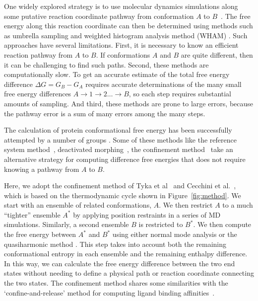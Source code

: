 \documentclass[12pt]{article}
\begin{document}
One widely explored strategy
is to use molecular dynamics simulations along some putative reaction coordinate pathway from conformation $A$ to
$B$~\cite{Elber2007,West2007,Haas2007,Jonsson1998,E2007,Dellago2002,Cheng2006,Elber2005,Chipot2007}. The free energy along this
reaction coordinate can then be determined using methods such as umbrella sampling \cite{Torrie1977,Mascarenhas2013}  
and weighted histogram analysis method (WHAM) \cite{Kumar1992}. Such
approaches have several limitations. First, it is necessary to know an efficient reaction pathway from $A$ to $B$. If
conformations $A$ and $B$ are quite different, then it can be challenging to find such paths. Second, these methods are
computationally slow. To get an accurate estimate of the total free energy difference $\Delta G = G_B - G_A$ requires
accurate determinations of the many small free energy differences $A \rightarrow 1 \rightarrow 2 \ldots \rightarrow B$,
so each step requires substantial amounts of sampling.  And third, these methods are prone to large errors, because the
pathway error is a sum of many errors among the many steps.

The calculation of protein conformational free energy has been successfully attempted by a number of groups
\cite{Ytreber2006a,Shell2010,Ytreberg2006,Zheng2008,Spichty2010,Strajbl2000,Park2008,Tyka2006,Cecchini2009,Ovchinnikov2013}. Some of
these methods like the reference system method~\cite{Ytreberg2006}, deactivated morphing~\cite{Park2008}, the
confinement method~\cite{Tyka2006,Cecchini2009,Ovchinnikov2013} take an alternative strategy for computing difference
free energies that does not require knowing a pathway from $A$ to $B$.  

Here, we adopt the confinement method of Tyka et al~\cite{Tyka2006} and Cecchini et al.~\cite{Cecchini2009}, which is
based on the thermodynamic cycle shown in Figure~\ref{fig:method}. We start with an ensemble of related conformations,
$A$. We then restrict $A$ to a much ``tighter'' ensemble $A^\ast$ by applying position restraints in a series of MD
simulations. Similarly, a second ensemble $B$ is restricted to $B^\ast$. We then compute the free energy between
$A^\ast$ and $B^\ast$ using either normal mode analysis \cite{Brooks1983,Case1994} or the quasiharmonic 
method \cite{Karplus1981,Levy1984}. This step takes into account
both the remaining conformational entropy in each ensemble and the remaining enthalpy difference. In this way, we can
calculate the free energy difference between the two end states without needing to define a physical path or reaction
coordinate connecting the two states. The confinement method shares some similarities with the `confine-and-release'
method for computing ligand binding affinities~\cite{Mobley2007,Mobley2012,Mobley2006}.
\end{document}
